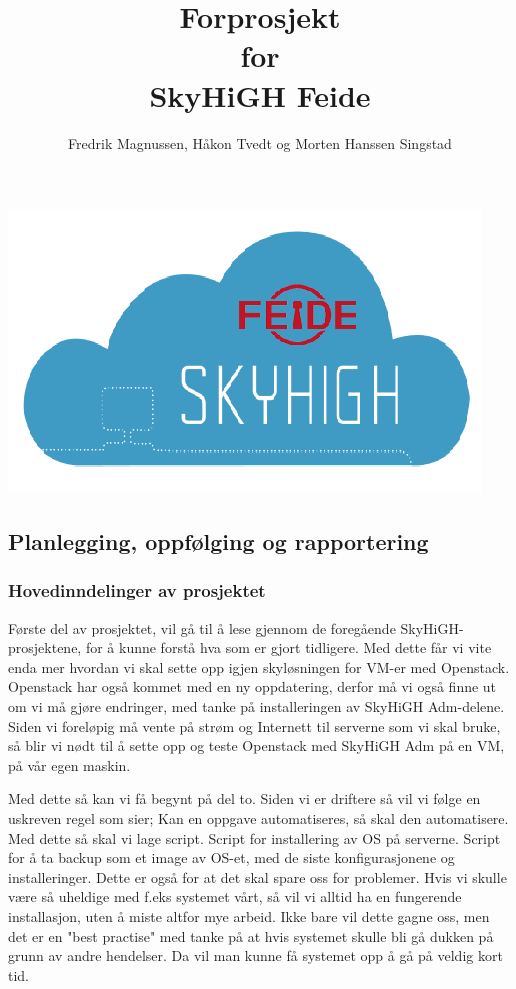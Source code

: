 \documentclass[12pt,a4paper]{article}
\begin{document}
\title{Forprosjekt \\ for \\ SkyHiGH Feide}
\author{Fredrik Magnussen, Håkon Tvedt og Morten Hanssen Singstad}
\maketitle
\begin{center}
\includegraphics[scale=1]{logo.png}
\end{center}

\newpage
\tableofcontents

\newpage
\subsection{Planlegging, oppfølging og rapportering}
\subsubsection{Hovedinndelinger av prosjektet}
Første del av prosjektet, vil gå til å lese gjennom de foregående SkyHiGH-prosjektene, for å kunne forstå hva som er 
gjort tidligere. Med dette får vi vite enda mer hvordan vi skal sette opp igjen skyløsningen for VM-er med Openstack.
Openstack har også kommet med en ny oppdatering, derfor må vi også finne ut om vi må gjøre endringer, med tanke på installeringen 
av SkyHiGH Adm-delene. Siden vi foreløpig må vente på strøm og Internett til serverne som vi skal bruke, så blir vi nødt til å 
sette opp og teste Openstack med SkyHiGH Adm på en VM, på vår egen maskin. \newline \newline

Med dette så kan vi få begynt på del to. Siden vi er driftere så vil vi følge en uskreven regel som sier; Kan en oppgave automatiseres, så skal den automatisere.
Med dette så skal vi lage script. Script for installering av OS på serverne. Script for å ta backup som et image av OS-et, med de siste konfigurasjonene og installeringer.
Dette er også for at det skal spare oss for problemer. Hvis vi skulle være så uheldige med f.eks systemet vårt, så vil vi alltid ha en fungerende installasjon, uten å miste
altfor mye arbeid. Ikke bare vil dette gagne oss, men det er en "best practise" med tanke på at hvis systemet skulle bli gå dukken på grunn av andre hendelser. Da vil 
man kunne få systemet opp å gå på veldig kort tid. \newline \newline
\end{document}
